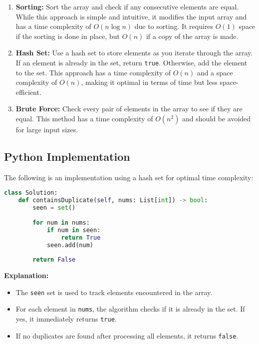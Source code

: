 \begin{enumerate}
    \item \textbf{Sorting:}  
    Sort the array and check if any consecutive elements are equal. While this approach is simple and intuitive, it modifies the input array and has a time complexity of \(O(n \log n)\) due to sorting. It requires \(O(1)\) space if the sorting is done in place, but \(O(n)\) if a copy of the array is made.

    \item \textbf{Hash Set:}  
    Use a hash set to store elements as you iterate through the array. If an element is already in the set, return \texttt{true}. Otherwise, add the element to the set. This approach has a time complexity of \(O(n)\) and a space complexity of \(O(n)\), making it optimal in terms of time but less space-efficient.

    \item \textbf{Brute Force:}  
    Check every pair of elements in the array to see if they are equal. This method has a time complexity of \(O(n^2)\) and should be avoided for large input sizes.
\end{enumerate}

\subsection*{Python Implementation}
The following is an implementation using a hash set for optimal time complexity:

\begin{fullwidth}
\begin{lstlisting}[language=Python]
class Solution:
    def containsDuplicate(self, nums: List[int]) -> bool:
        seen = set()
        
        for num in nums:
            if num in seen:
                return True
            seen.add(num)
        
        return False
\end{lstlisting}
\end{fullwidth}

\textbf{Explanation:}
\begin{itemize}
    \item The \texttt{seen} set is used to track elements encountered in the array.
    \item For each element in \texttt{nums}, the algorithm checks if it is already in the set. If yes, it immediately returns \texttt{true}.
    \item If no duplicates are found after processing all elements, it returns \texttt{false}.
\end{itemize}


